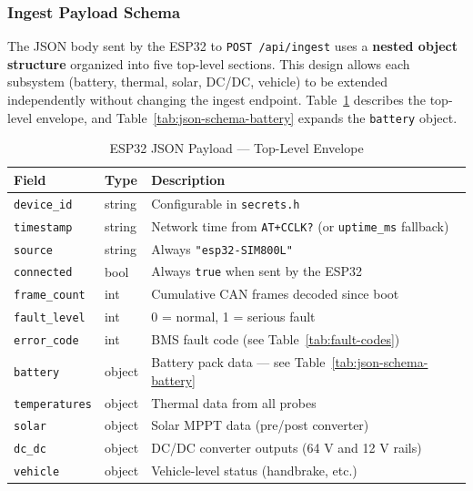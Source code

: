 \subsubsection{Ingest Payload Schema}

The JSON body sent by the ESP32 to \texttt{POST /api/ingest} uses a \textbf{nested object structure} organized into five top-level sections. This design allows each subsystem (battery, thermal, solar, DC/DC, vehicle) to be extended independently without changing the ingest endpoint. Table~\ref{tab:json-schema-top} describes the top-level envelope, and Table~\ref{tab:json-schema-battery} expands the \texttt{battery} object.

\begin{table}[h]
    \centering
    \caption{ESP32 JSON Payload — Top-Level Envelope}
    \label{tab:json-schema-top}
    \begin{tabular}{lll}
        \toprule
        \textbf{Field} & \textbf{Type} & \textbf{Description} \\
        \midrule
        \texttt{device\_id}   & string & Configurable in \texttt{secrets.h} \\
        \texttt{timestamp}    & string & Network time from \texttt{AT+CCLK?} (or \texttt{uptime\_ms} fallback) \\
        \texttt{source}       & string & Always \texttt{"esp32-SIM800L"} \\
        \texttt{connected}    & bool   & Always \texttt{true} when sent by the ESP32 \\
        \texttt{frame\_count} & int    & Cumulative CAN frames decoded since boot \\
        \texttt{fault\_level} & int    & 0 = normal, 1 = serious fault \\
        \texttt{error\_code}  & int    & BMS fault code (see Table~\ref{tab:fault-codes}) \\
        \texttt{battery}      & object & Battery pack data — see Table~\ref{tab:json-schema-battery} \\
        \texttt{temperatures} & object & Thermal data from all probes \\
        \texttt{solar}        & object & Solar MPPT data (pre/post converter) \\
        \texttt{dc\_dc}       & object & DC/DC converter outputs (64 V and 12 V rails) \\
        \texttt{vehicle}      & object & Vehicle-level status (handbrake, etc.) \\
        \bottomrule
    \end{tabular}
\end{table}

